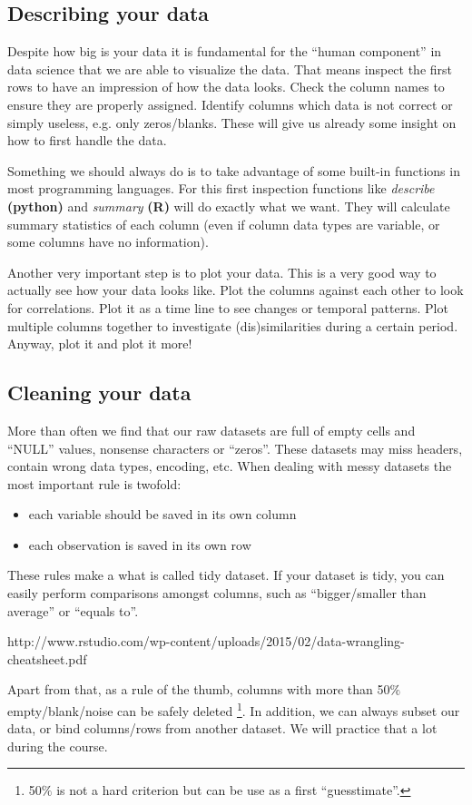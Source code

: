 \subsection{Describing your data}\label{Analy.1}

Despite how big is your data it is fundamental for the ``human component'' in data science that we are able to visualize the data. That means inspect the first rows to have an impression of how the data looks. Check the column names to ensure they are properly assigned. Identify columns which data is not correct or simply useless, e.g. only zeros/blanks. These will give us already some insight on how to first handle the data. 

Something we should always do is to take advantage of some built-in functions in most programming languages. For this first inspection functions like \textit{describe} \textbf{(python)} and \textit{summary} \textbf{(R)} will do exactly what we want. They will calculate summary statistics of each column (even if column data types are variable, or some columns have no information). 

Another very important step is to plot your data. This is a very good way to actually see how your data looks like. Plot the columns against each other to look for correlations. Plot it as a time line to see changes or temporal patterns. Plot multiple columns together to investigate (dis)similarities during a certain period. Anyway, plot it and plot it more!

\subsection{Cleaning your data}\label{Analy.2}

More than often we find that our raw datasets are full of empty cells and ``NULL'' values, nonsense characters or ``zeros''. These datasets may miss headers, contain wrong data types, encoding, etc. When dealing with messy datasets the most important rule is twofold:

\begin{itemize}
\item each variable should be saved in its own column
\item each observation is saved in its own row
\end{itemize}

These rules make a what is called tidy dataset. If your dataset is tidy, you can easily perform comparisons amongst columns, such as ``bigger/smaller than average'' or ``equals to''. 


http://www.rstudio.com/wp-content/uploads/2015/02/data-wrangling-cheatsheet.pdf

Apart from that, as a rule of the thumb, columns with more than 50$\%$ empty/blank/noise can be safely deleted \footnote{50$\%$ is not a hard criterion but can be use as a first ``guesstimate''.}. In addition, we can always subset our data, or bind columns/rows from another dataset. We will practice that a lot during the course.  